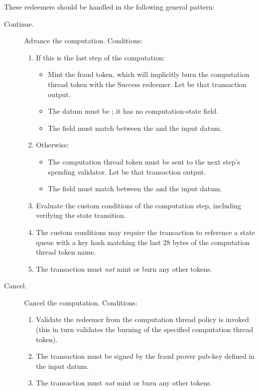 \documentclass[../midgard.tex]{subfiles}
\begin{document}
These redeemers should be handled in the following general pattern:
\begin{description}
    \item[Continue.] Advance the computation.
      Conditions:
        \begin{enumerate}
            \item If this is the last step of the computation:
                \begin{itemize}
                    \item Mint the fraud token, which will implicitly burn the computation thread token with the Success redeemer.
                      Let  be that transaction output.
                    \item The  datum must be ; it has no computation-state field.
                    \item The  field must match between the  and the input datum.
                \end{itemize}
            \item Otherwise:
                \begin{itemize}
                    \item The computation thread token must be sent to the next step's spending validator.
                      Let  be that transaction output.
                    \item The  field must match between the  and the input datum.
                \end{itemize}
            \item Evaluate the custom conditions of the computation step, including verifying the state transition.
            \item The custom conditions may require the transaction to reference a state queue with a key hash matching the last 28 bytes of the computation thread token name.
            \item The transaction must \emph{not} mint or burn any other tokens.
        \end{enumerate}
    \item[Cancel.] Cancel the computation.
      Conditions:
        \begin{enumerate}
            \item Validate the  redeemer from the computation thread policy is invoked (this in turn validates the burning of the specified computation thread token).
            \item The transaction must be signed by the fraud prover pub-key defined in the input datum.
            \item The transaction must \emph{not} mint or burn any other tokens.
        \end{enumerate}
\end{description}
\end{document}
